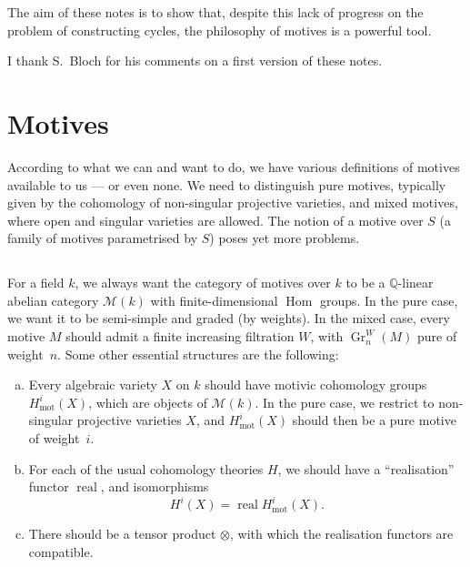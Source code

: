 \documentclass{article}
\theoremstyle{plain}
\theoremstyle{definition}
\newcommand{\sh}{\mathscr}
\newcommand{\QQ}{\mathbb{Q}}
\newcommand{\mot}{\mathrm{mot}}
\DeclareMathOperator{\Hom}{Hom}
\DeclareMathOperator{\real}{real}
\DeclareMathOperator{\Gr}{Gr}
\newcommand{\oldpage}[1]{\marginpar{\footnotesize$\Big\vert$ \textit{p.~#1}}}
\begin{document}
\oldpage{145}
The aim of these notes is to show that, despite this lack of progress on the problem of constructing cycles, the philosophy of motives is a powerful tool.

I thank S.~Bloch for his comments on a first version of these notes.


\section{Motives}
\label{1}

According to what we can and want to do, we have various definitions of motives available to us --- or even none.
We need to distinguish pure motives, typically given by the cohomology of non-singular projective varieties, and mixed motives, where open and singular varieties are allowed.
The notion of a motive over $S$ (a family of motives parametrised by $S$) poses yet more problems.

\subsection{}
\label{1.1}

For a field $k$, we always want the category of motives over $k$ to be a $\QQ$-linear abelian category $\sh{M}(k)$ with finite-dimensional $\Hom$ groups.
In the pure case, we want it to be semi-simple and graded (by weights).
In the mixed case, every motive $M$ should admit a finite increasing filtration $W$, with $\Gr_n^W(M)$ pure of weight~$n$.
Some other essential structures are the following:
\begin{enumerate}[(a)]
  \item Every algebraic variety $X$ on $k$ should have motivic cohomology groups $H_\mot^i(X)$, which are objects of $\sh{M}(k)$.
    In the pure case, we restrict to non-singular projective varieties $X$, and $H_\mot^i(X)$ should then be a pure motive of weight~$i$.
  \item For each of the usual cohomology theories $H$, we should have a ``realisation'' functor $\real$, and isomorphisms
    \[
      H^i(X) = \real H_\mot^i(X).
    \]
  \item There should be a tensor product $\otimes$, with which the realisation functors are compatible.
\end{enumerate}

\subsection{}
\label{1.2}
\end{document}
